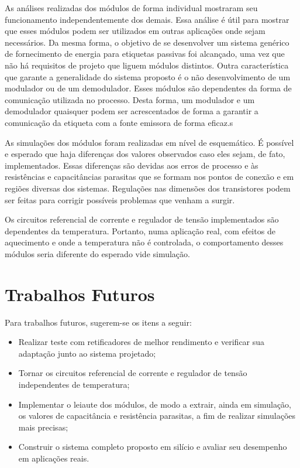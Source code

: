 As análises realizadas dos módulos de forma individual mostraram seu funcionamento independentemente dos demais. Essa análise é útil para mostrar que esses módulos podem ser utilizados em outras aplicações onde sejam necessários. Da mesma forma, o objetivo de se desenvolver um sistema genérico de fornecimento de energia para etiquetas passivas foi alcançado, uma vez que não há requisitos de projeto que liguem módulos distintos. Outra característica que garante a generalidade do sistema proposto é o não desenvolvimento de um modulador ou de um demodulador. Esses módulos são dependentes da forma de comunicação utilizada no processo. Desta forma, um modulador e um demodulador quaisquer podem ser acrescentados de forma a garantir a comunicação da etiqueta com a fonte emissora de forma eficaz.s

As simulações dos módulos foram realizadas em nível de esquemático. É possível e esperado que haja diferenças dos valores observados caso eles sejam, de fato, implementados. Essas diferenças são devidas aos erros de processo e às resistências e capacitâncias parasitas que se formam nos pontos de conexão e em regiões diversas dos sistemas. Regulações nas dimensões dos transistores podem ser feitas para corrigir possíveis problemas que venham a surgir.

Os circuitos referencial de corrente e regulador de tensão implementados são dependentes da temperatura. Portanto, numa aplicação real, com efeitos de aquecimento e onde a temperatura não é controlada, o comportamento desses módulos seria diferente do esperado vide simulação.


\section{Trabalhos Futuros}
Para trabalhos futuros, sugerem-se os itens a seguir:

\begin{itemize}
	\item Realizar teste com retificadores de melhor rendimento e verificar sua adaptação junto ao sistema projetado;
	\item Tornar os circuitos referencial de corrente e regulador de tensão independentes de temperatura;
	\item Implementar o leiaute dos módulos, de modo a extrair, ainda em simulação, os valores de capacitância e resistência parasitas, a fim de realizar simulações mais precisas;
	\item Construir o sistema completo proposto em silício e avaliar seu desempenho em aplicações reais.
\end{itemize}
